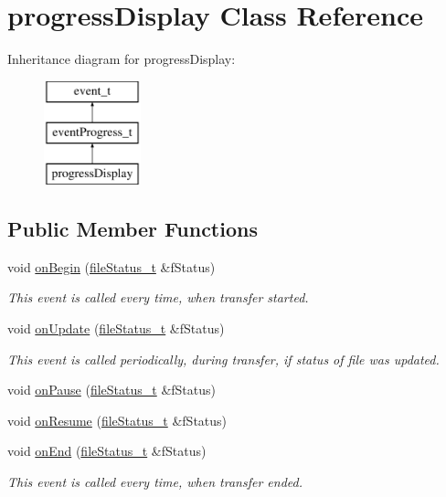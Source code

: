 \hypertarget{classprogressDisplay}{\section{progress\-Display \-Class \-Reference}
\label{classprogressDisplay}
}
\-Inheritance diagram for progress\-Display\-:\begin{figure}[H]
\begin{center}
\leavevmode
\includegraphics[height=3.000000cm]{classprogressDisplay}
\end{center}
\end{figure}
\subsection*{\-Public \-Member \-Functions}
\begin{DoxyCompactItemize}
\item 
void \hyperlink{classprogressDisplay_a12b174a4eebbb848b2a6f4bc864fbf8c}{on\-Begin} (\hyperlink{classfileStatus__t}{file\-Status\-\_\-t} \&f\-Status)
\begin{DoxyCompactList}\small\item\em \-This event is called every time, when transfer started. \end{DoxyCompactList}\item 
void \hyperlink{classprogressDisplay_a3c0cca295db37eac26e4ba196f0b1880}{on\-Update} (\hyperlink{classfileStatus__t}{file\-Status\-\_\-t} \&f\-Status)
\begin{DoxyCompactList}\small\item\em \-This event is called periodically, during transfer, if status of file was updated. \end{DoxyCompactList}\item 
void \hyperlink{classprogressDisplay_a9aa06d39ad18025d7c73ce394ff90e97}{on\-Pause} (\hyperlink{classfileStatus__t}{file\-Status\-\_\-t} \&f\-Status)
\item 
void \hyperlink{classprogressDisplay_aaf5bcea9ea647f7a77e03b59ea05d68d}{on\-Resume} (\hyperlink{classfileStatus__t}{file\-Status\-\_\-t} \&f\-Status)
\item 
void \hyperlink{classprogressDisplay_a60107225c2493aee1a1948ca10154b47}{on\-End} (\hyperlink{classfileStatus__t}{file\-Status\-\_\-t} \&f\-Status)
\begin{DoxyCompactList}\small\item\em \-This event is called every time, when transfer ended. \end{DoxyCompactList}\end{DoxyCompactItemize}


